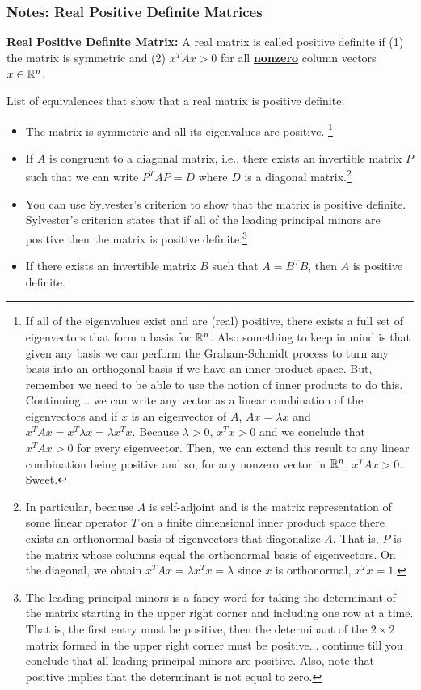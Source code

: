 \documentclass{article}
\begin{document}
\subsubsection{Notes: Real Positive Definite Matrices}
	
\textbf{Real Positive Definite Matrix:} A real matrix is called positive definite if (1) the matrix is symmetric and (2) $x^TAx > 0$ for all \underline{\textbf{nonzero}} column vectors $x\in\mathbb R^n$. 

List of equivalences that show that a real matrix is positive definite:

	\begin{itemize}
		\item The matrix is symmetric and all its eigenvalues are positive.
			\footnote{If all of the eigenvalues exist and are (real) positive, there exists a full set of eigenvectors that form a basis for $\mathbb R^n$. Also something to keep in mind is that given any basis we can perform the Graham-Schmidt process to turn any basis into an orthogonal basis if we have an inner product space. But, remember we need to be able to use the notion of inner products to do this. Continuing... we can write any vector as a linear combination of the eigenvectors and if $x$ is an eigenvector of $A$, $Ax = \lambda x$ and $x^T Ax = x^T \lambda x = \lambda x^T x$. Because $\lambda > 0$, $x^Tx >0$ and we conclude that $x^T Ax > 0$ for every eigenvector. Then, we can extend this result to any linear combination being positive and so, for any nonzero vector in $\mathbb R^n$, $x^TAx > 0$. Sweet.}
		\item If $A$ is congruent to a diagonal matrix, i.e., there exists an invertible matrix $P$ such that we can write $P^T A P = D$ where 
			$D$ is a diagonal matrix.\footnote{In particular, because $A$ is self-adjoint and is the matrix representation of some linear operator $T$ on a finite dimensional inner product space there exists an orthonormal basis of eigenvectors that diagonalize $A$. That is, $P$ is the matrix whose columns equal the orthonormal basis of eigenvectors. On the diagonal, we obtain $x^T A x = \lambda x^Tx = \lambda$ since $x$ is orthonormal, $x^Tx = 1$.}
		\item You can use Sylvester's criterion to show that the matrix is positive definite. Sylvester's criterion states that if all of the 
			leading principal minors are positive then the matrix is positive definite.\footnote{The leading principal minors is a fancy word for taking the determinant of the matrix starting in the upper right corner and including one row at a time. That is, the first entry must be positive, then the determinant of the $2\times 2$ matrix formed in the upper right corner must be positive... continue till you conclude that all leading principal minors are positive. Also, note that positive implies that the determinant is not equal to zero.}
		\item If there exists an invertible matrix $B$ such that $A = B^TB$, then $A$ is positive definite. 
	\end{itemize}
	
\end{document}
